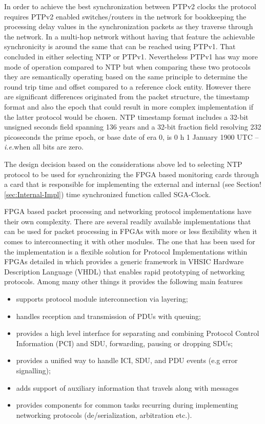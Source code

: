 \documentclass[journal]{IEEEtran}
\begin{document}
In order to achieve the best synchronization between PTPv2 clocks the protocol requires PTPv2 enabled switches/routers
in the network for bookkeeping the processing delay values in the synchronization packets as they traverse through the
network.
In a multi-hop network without having that feature the achievable synchronicity is around the same that can be reached
using
PTPv1.
That concluded in either selecting NTP or PTPv1. Nevertheless PTPv1 has way more mode of operation compared to NTP but
when comparing these two protocols they are semantically operating based on the same principle to determine the round
trip time and offset
compared to a reference clock entity. However there are significant differences originated from the packet structure, the
timestamp format and also the epoch that could result in more complex implementation if the latter protocol would be chosen.
NTP timestamp format includes a 32-bit unsigned seconds field spanning 136 years and a 32-bit fraction field resolving 232 
picoseconds the prime epoch, or base date of era 0, is 0 h 1 January 1900 UTC -- \emph{i.e.}when all bits are zero.

The design decision based on the considerations above led to selecting NTP protocol to be used for synchronizing the
FPGA based monitoring cards through a card that is responsible for implementing the external and internal (see
Section!\ref{sec:Internal-Impl}) time synchronized function called SGA-Clock.

FPGA based packet processing and networking protocol implementations have their own complexity. There are several
readily available implementations that can be used for packet processing in FPGAs with more or less flexibility when it
comes to interconnecting it
with other modules. The one that has been used for the implementation is a flexible solution for  Protocol
Implementations within FPGAs detailed in \cite{ProtoImpl} which provides a generic framework in VHSIC Hardware
Description Language (VHDL) that enables rapid prototyping of networking protocols. Among many other things it provides
the following main features
\begin{itemize}
    \renewcommand \labelitemi{--}
    \item supports protocol module interconnection via layering;
    \item handles reception and transmission of PDUs with queuing;
    \item provides a high level interface for separating and combining	Protocol Control Information (PCI) and SDU,
          forwarding, pausing or dropping SDUs;
    \item provides a unified way to handle ICI, SDU, and PDU events (e.g error signalling);
    \item adds support of auxiliary information that travels along with messages
    \item provides components for common tasks recurring during implementing networking protocols
          (de/serialization, arbitration etc.).
\end{itemize}
\end{document}
